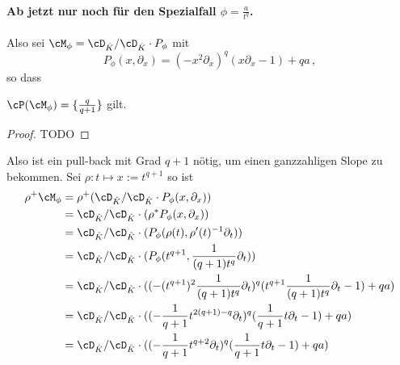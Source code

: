 \paragraph{Ab jetzt nur noch für den Spezialfall $\phi=\frac{a}{t^{q}}$.}
Also sei $\cM_\phi=\cD_{\hat K}/\cD_{\hat K}\cdot P_\phi$ mit
\[
P_{\phi}(x,\partial_x) =(-x^2\partial_x)^{q} (x\partial_x-1)+qa \,,
\]
so dass
\begin{lem}
$\cP(\cM_{\phi})=\{\frac{q}{q+1}\}$ gilt.
\end{lem}
\begin{proof} \cite[5.b.]{sabbah_Fourier-local}
TODO
\begin{comment}
über L-Symbol? Stützfunktion? Versuch:\\
Mit $L=q s_0 + (q+1)s_2$ gilt
\[
\sigma_L(P)= \pm x^{2q+1}\partial_x^{q+1} + qa \,,
\]
welches aus mehr als einem Monom besteht, deshalb ist der zu $L$ zugehörige
Slope $\frac{q}{q+1}$ ein Slope von $P$. Da $q+1$ die höchste vorkommende
$\partial_x$-Potez ist, kann es auch keinen weiteren Slope geben.
\end{comment}
\end{proof}
Also ist ein pull-back mit Grad $q+1$ nötig, um einen ganzzahligen Slope zu
bekommen.
Sei $\rho:t\mapsto x:=t^{q+1}$ so ist
\begin{align*}
\rho^+\cM_\phi &= \rho^+(\cD_{\hat K}/\cD_{\hat K}\cdot P_\phi(x,\partial_x))\\
  &=\cD_{\hat K}/\cD_{\hat K}\cdot(\rho^*P_\phi(x,\partial_x))\\
  &=\cD_{\hat K}/\cD_{\hat K}\cdot(P_\phi(\rho(t),\rho'(t)^{-1}\partial_t))\\
  &=\cD_{\hat K}/\cD_{\hat K}
    \cdot(P_\phi(t^{q+1},\frac{1}{(q+1)t^q}\partial_t))\\
  &=\cD_{\hat K}/\cD_{\hat K}
    \cdot((-(t^{q+1})^2\frac{1}{(q+1)t^{q}}\partial_t)^{q}
    (t^{q+1}\frac{1}{(q+1)t^{q}}\partial_t-1)+qa)\\
  &=\cD_{\hat K}/\cD_{\hat K}
    \cdot((-\frac{1}{q+1}t^{2(q+1)-q}\partial_t)^{q}
    (\frac{1}{q+1}t\partial_t-1)+qa)\\
  &=\cD_{\hat K}/\cD_{\hat K}
    \cdot((-\frac{1}{q+1}t^{q+2}\partial_t)^{q}
    (\frac{1}{q+1}t\partial_t-1)+qa)
\end{align*}
